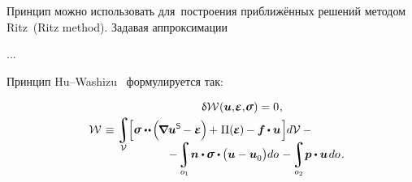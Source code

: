 \begin{otherlanguage}{russian}

Принцип можно использовать для~построения приближённых решений методом Ritz~(Ritz method).
Задавая аппроксимации

...

Принцип Hu\hbox{--}Washizu~\cite{washizubook} формулируется так:

\nopagebreak\vspace{-0.2em}\begin{multline}\label{huwashizuvariationalprinciple}
\hfil \variation{\mathcal{W}} \hspace{.1ex} (\bm{u}, \hspace{-0.32ex}\infinitesimaldeformation, \hspace{-0.32ex}\linearstress) = 0
\hspace{.1ex} ,
\\[-0.1em]
%
\shoveleft{\displaystyle \mathcal{W} \hspace{.2ex} \equiv
\displaystyle\integral\displaylimits_{\mathcal{V}} \hspace{-0.3ex}
\Bigl[
\linearstress \dotdotp \hspace{-0.2ex} \Bigl( \hspace{-0.2ex} \boldnabla {\bm{u}}^{\mathsf{S}} \hspace{-0.2ex} - \infinitesimaldeformation \hspace{-0.1ex} \Bigr) \hspace{-0.2ex} + \hspace{.1ex} \potential(\hspace{-0.1ex}\infinitesimaldeformation\hspace{-0.1ex})\hspace{-0.1ex} -
\bm{f} \hspace{-0.1ex} \dotp \bm{u}
\hspace{.2ex} \Bigr] \hspace{-0.1ex} d\mathcal{V} \hspace{.5ex}
- \hfill}
\\[-1.2em]
%
\hspace{8em}
- \hspace{-0.2ex} \displaystyle\integral\displaylimits_{o_1} \hspace{-0.4ex} \unitnormalvector \dotp \hspace{-0.1ex} \linearstress \dotp \hspace{-0.1ex} \bigl( \bm{u} - \bm{u}_{\raisemath{-0.1em}{0}} \bigr) do \hspace{.2ex}
- \hspace{-0.2ex} \integral\displaylimits_{o_2} \hspace{-0.4ex} \bm{p} \dotp \bm{u} \hspace{.25ex} do
\hspace{.2ex} .
\end{multline}


\end{otherlanguage}
